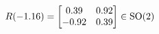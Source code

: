 \documentclass[preview]{standalone}
\begin{document}
\begin{align*}
\special{dvisvgm:raw <g id='unique000'>}R(-1.16) = \begin{bmatrix} 0.39 & 0.92 \\ -0.92 & 0.39 \end{bmatrix} \in \text{SO}(2)\special{dvisvgm:raw </g>}
\end{align*}
\end{document}
